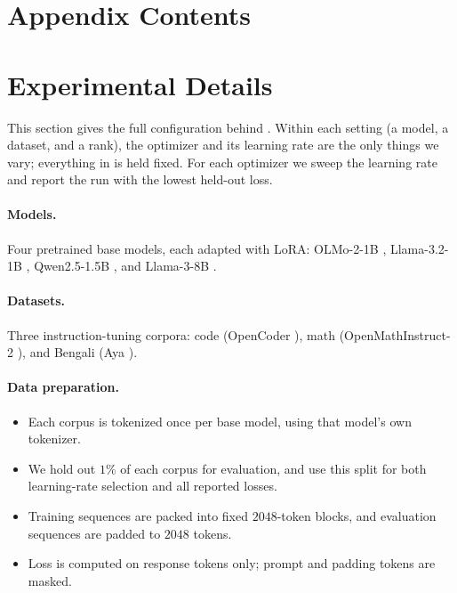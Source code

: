 \documentclass[11pt]{article}
\theoremstyle{plain}
\theoremstyle{definition}
\theoremstyle{remark}
\theoremstyle{definition}
\begin{document}
\printbibliography


\clearpage
\appendix
{}
\startcontents[app]
\section*{Appendix Contents}
\clearpage
\section{Experimental Details}
\label{app:exp}
This section gives the full configuration behind . Within each setting (a model, a dataset, and a rank), the optimizer and its learning rate are the only things we vary; everything in  is held fixed. For each optimizer we sweep the learning rate and report the run with the lowest held-out loss.

\paragraph{Models.} Four pretrained base models, each adapted with LoRA: OLMo-2-1B \cite{olmo2}, Llama-3.2-1B \cite{llama3}, Qwen2.5-1.5B \cite{qwen25}, and Llama-3-8B \cite{llama3}.

\paragraph{Datasets.} Three instruction-tuning corpora: code (OpenCoder \cite{opencoder}), math (OpenMathInstruct-2 \cite{openmathinstruct2}), and Bengali (Aya \cite{aya}).

\paragraph{Data preparation.}
\begin{itemize}[leftmargin=1.5em,itemsep=1pt,topsep=2pt]
  \item Each corpus is tokenized once per base model, using that model's own tokenizer.
  \item We hold out $1\%$ of each corpus for evaluation, and use this split for both learning-rate selection and all reported losses.
  \item Training sequences are packed into fixed $2048$-token blocks, and evaluation sequences are padded to $2048$ tokens.
  \item Loss is computed on response tokens only; prompt and padding tokens are masked.
\end{itemize}
\end{document}
